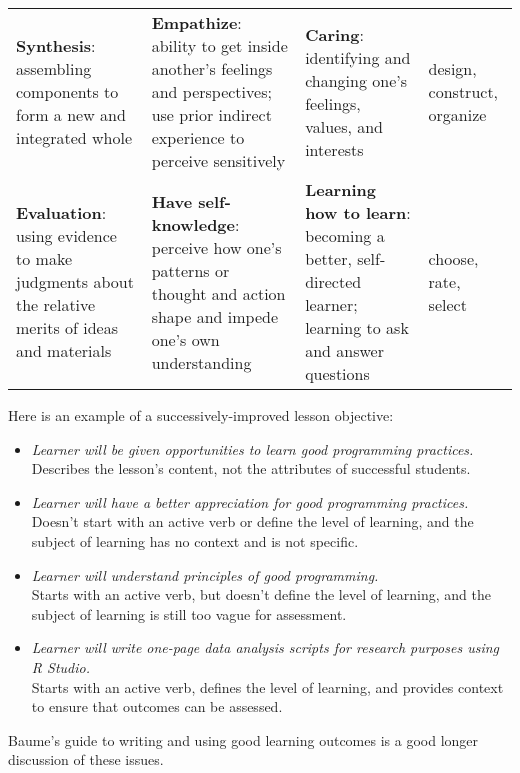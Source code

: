 \begin{tabular}{p{}p{}p{}p{}}
\textbf{Synthesis}: assembling components to form a new and integrated whole
&
\textbf{Empathize}: ability to get inside another's feelings and perspectives; use prior indirect experience to perceive sensitively
&
\textbf{Caring}: identifying and changing one's feelings, values, and interests
&
design, construct, organize
\\

\textbf{Evaluation}: using evidence to make judgments about the relative merits of ideas and materials
&
\textbf{Have self-knowledge}: perceive how one's patterns or thought and action shape and impede one's own understanding
&
\textbf{Learning how to learn}: becoming a better, self-directed learner; learning to ask and answer questions
&
choose, rate, select
\\

\end{tabular}

Here is an example of a successively-improved lesson objective:

\begin{itemize}
\item
  \emph{Learner will be given opportunities to learn good programming practices.}
  \\
  Describes the lesson's content, not the attributes of successful students.
\item
  \emph{Learner will have a better appreciation for good programming practices.}
  \\
  Doesn't start with an active verb or define the level of learning,
  and the subject of learning has no context and is not specific.
\item
  \emph{Learner will understand principles of good programming.}
  \\
  Starts with an active verb, but doesn't define the level of learning,
  and the subject of learning is still too vague for assessment.
\item
  \emph{Learner will write one-page data analysis scripts for research purposes using R Studio.}
  \\
  Starts with an active verb, defines the level of learning,
  and provides context to ensure that outcomes can be assessed.
\end{itemize}

Baume's guide to
writing and using good learning outcomes \cite{bib:baume-fixme} is a good longer discussion of these
issues.

